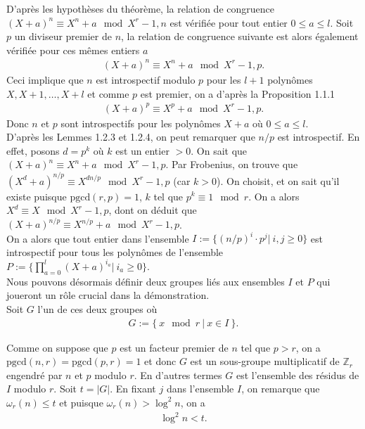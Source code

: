 \documentclass[11pt]{article}
\newcommand{\pgcd}{\mathrm{pgcd}}
\begin{document}
D'après les hypothèses du théorème, la relation de congruence $(X+a)^n \equiv X^n + a \mod X^r-1,n$ est vérifiée pour tout entier $0 \leqslant a \leqslant l$. Soit $p$ un diviseur premier de $n$, la relation de congruence suivante est alors également vérifiée pour ces mêmes entiers $a$
\begin{align*}
(X+a)^n \equiv X^n+a \mod X^r-1,p.
\end{align*}
Ceci implique que $n$ est introspectif modulo $p$ pour les $l+1$ polynômes $X, X+1, \dots, X+l$ et comme $p$ est premier, on a d'après la Proposition 1.1.1
\begin{align*}
(X+a)^p \equiv X^p+a \mod X^r-1,p.
\end{align*}
\noindent
Donc $n$ et $p$ sont introspectifs pour les polynômes $X+a$ où $0 \leqslant a \leqslant l$.\\

D'après les Lemmes 1.2.3 et 1.2.4, on peut remarquer que $n/p$ est introspectif. En effet, posons $d=p^k$ où $k$ est un entier $>0$. On sait que $(X+a)^n \equiv X^n+a \mod X^r-1,p$. Par Frobenius, on trouve que $(X^d+a)^{n/p} \equiv X^{dn/p} \mod X^r-1,p$ (car $k>0$). On choisit, et on sait qu'il existe puisque $\pgcd(r,p)=1$, $k$ tel que $p^k \equiv 1 \mod r$. On a alors $X^d  \equiv X \mod X^r-1,p$, dont on déduit que $(X+a)^{n/p} \equiv X^{n/p}+a \mod X^r-1,p$.\\

On a alors que tout entier dans l'ensemble $I := \{(n/p)^i \cdot p^j \vert \  i,j \geqslant 0\}$ est introspectif pour tous les polynômes de l'ensemble $P:=\{\prod_{a=0}^{l} (X+a)^{i_a} \vert \  i_a \geqslant 0\}$.\\

Nous pouvons désormais définir deux groupes liés aux ensembles $I$ et $P$ qui joueront un rôle crucial dans la démonstration.\\

Soit $G$ l'un de ces deux groupes où
\begin{align*}
G:=\{\ x \mod r \ \vert \  x \in I\ \}.
\end{align*}

Comme on suppose que $p$ est un facteur premier de $n$ tel que $p>r$, on a $\pgcd(n,r)=\pgcd(p,r)=1$ et donc $G$ est un sous-groupe multiplicatif de $\mathbb{Z}_r$ engendré par $n$ et $p$ modulo $r$. En d'autres termes $G$ est l'ensemble des résidus de $I$ modulo $r$. Soit $t=\vert G \vert$. En fixant $j$ dans l'ensemble $I$, on remarque que $\omega_r(n) \leqslant t$ et puisque $\omega_r(n) > \log^2 n$, on a
\begin{align*}
\log^2 n < t.
\end{align*}
\end{document}
